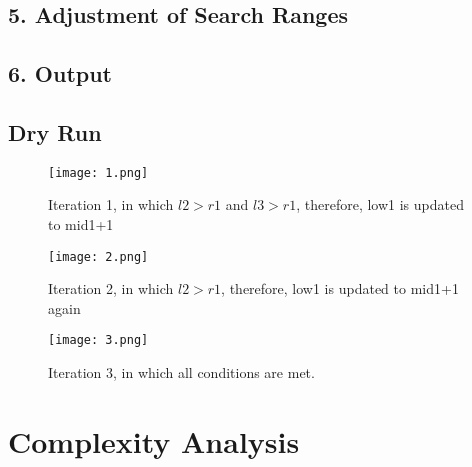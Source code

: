 \documentclass{article}
\begin{document}
{\subsection*{\large{5. Adjustment of Search Ranges}}
\fontsize{12}{15}\selectfont{
Based on the comparisons and conditions, the algorithm adjusts the binary search ranges for A and B accordingly to narrow down the search space.
}

\subsection*{\large{6. Output}}
\fontsize{12}{15}\selectfont{
Once the k-th smallest element is found, the algorithm prints or returns the result.
}

\subsection*{\Large{Dry Run}}
\fontsize{12}{15}



\begin{figure}[p]  %
    \centering
    \texttt{[image: 1.png]}
    \caption{Iteration 1, in which $l2 > r1$ and $l3 > r1$, therefore, low1 is updated to mid1+1}
\end{figure}
\clearpage

\begin{figure}[p]
    \centering
    \texttt{[image: 2.png]}
    \caption{Iteration 2, in which $l2 > r1$, therefore, low1 is updated to mid1+1 again}
\end{figure}
\clearpage

\begin{figure}[p]
    \centering
    \texttt{[image: 3.png]}
    \caption{Iteration 3, in which all conditions are met.}
    \label{fig:divide}
\end{figure}
\clearpage


\newpage

\section*{\huge{Complexity Analysis}}

\fontsize{12}{15}\selectfont{

}}
\end{document}
